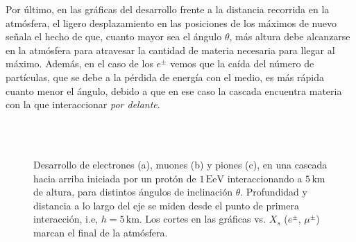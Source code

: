 \documentclass[11 pt, a4paper]{article} %
\numberwithin{equation}{section}
\numberwithin{figure}{section}
\numberwithin{table}{section}
\begin{document}
Por último, en las gráficas del desarrollo frente a la distancia recorrida en la atmósfera, el ligero desplazamiento en las posiciones de los máximos de nuevo señala el hecho de que, cuanto mayor sea el ángulo $\theta$, más altura debe alcanzarse en la atmósfera para atravesar la cantidad de materia necesaria para llegar al máximo. Además, en el caso de los $e^\pm$ vemos que la caída del número de partículas, que se debe a la pérdida de energía con el medio, es más rápida cuanto menor el ángulo, debido a que en ese caso la cascada encuentra materia con la que interaccionar \textit{por delante}.
\begin{figure}[H]
	\centering
	\\
	\\
	\caption{Desarrollo de electrones (a), muones (b) y piones (c), en una cascada hacia arriba iniciada por un protón de $1\,\mathrm{EeV}$ interaccionando a $5\,\mathrm{km}$ de altura, para distintos ángulos de inclinación $\theta$. Profundidad y distancia a lo largo del eje se miden desde el punto de primera interacción, i.e,  $h=5\,\mathrm{km}$. Los cortes en las gráficas vs. $X_s$ ($e^\pm$, $\mu^\pm$) marcan el final de la atmósfera.}
	\label{Carac_UG_vardeg}
\end{figure}
\end{document}
